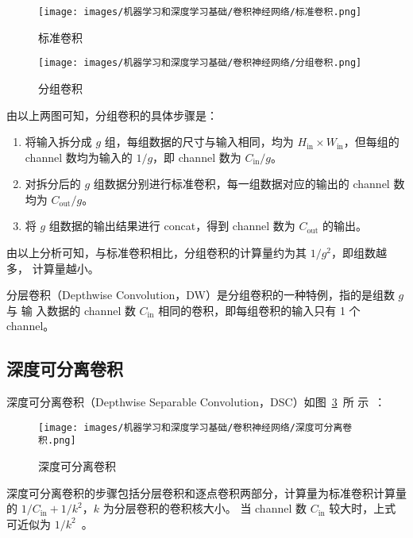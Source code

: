 \begin{figure}[ht]
  \centering
  \texttt{[image: images/机器学习和深度学习基础/卷积神经网络/标准卷积.png]}
  \caption{标准卷积}
  \label{fig:normal-conv}
\end{figure}

\begin{figure}[ht]
  \centering
  \texttt{[image: images/机器学习和深度学习基础/卷积神经网络/分组卷积.png]}
  \caption{分组卷积}
  \label{fig:group-conv}
\end{figure}

由以上两图可知，分组卷积的具体步骤是：

\begin{enumerate}
  \item 将输入拆分成 $g$ 组，每组数据的尺寸与输入相同，均为 $H_{\mathrm{in}}
    \times W_{\mathrm{in}}$，但每组的 channel 数均为输入的 $ 1/g $，即 channel
    数为 $ C_{\mathrm{in}} / g $。
  \item 对拆分后的 $g$ 组数据分别进行标准卷积，每一组数据对应的输出的 channel 数
    均为 $ C_{\mathrm{out}}/g $。
  \item 将 $g$ 组数据的输出结果进行 concat，得到 channel 数为 $C_{\mathrm{out}}$
    的输出。
\end{enumerate}

由以上分析可知，与标准卷积相比，分组卷积的计算量约为其 $ 1 / g^2 $，即组数越多，
计算量越小。

分层卷积（Depthwise Convolution，DW）是分组卷积的一种特例，指的是组数 $g$ 与 输
入数据的 channel 数 $C_{\mathrm{in}}$ 相同的卷积，即每组卷积的输入只有 1 个 channel。

\subsection{深度可分离卷积}

深度可分离卷积（Depthwise Separable Convolution，DSC）如图~\ref{fig:ds-conv}~所
示~：

\begin{figure}[ht]
  \centering
  \texttt{[image: images/机器学习和深度学习基础/卷积神经网络/深度可分离卷积.png]}
  \caption{深度可分离卷积}
  \label{fig:ds-conv}
\end{figure}

深度可分离卷积的步骤包括分层卷积和逐点卷积两部分，计算量为标准卷积计算量的 $ 1 /
C_{\mathrm{in}} + 1/k^2 $，$k$ 为分层卷积的卷积核大小。
当 channel 数 $C_{\mathrm{in}}$ 较大时，上式可近似为 $1 / k^2$~。

